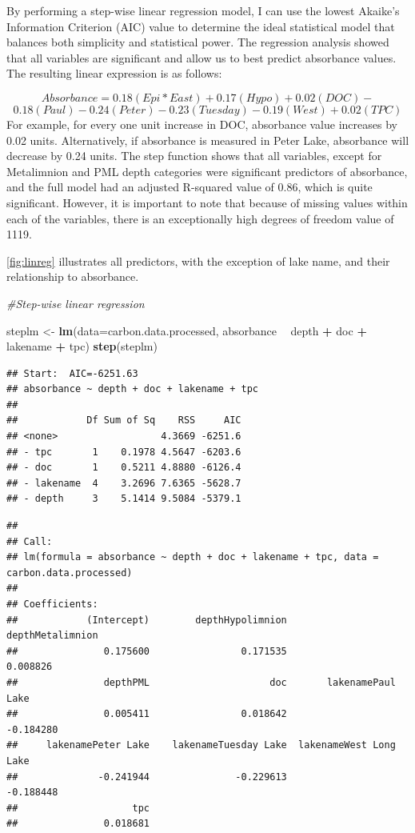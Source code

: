 \documentclass[12pt,]{article}
\newenvironment{Shaded}{\begin{snugshade}}{\end{snugshade}}
\newcommand{\KeywordTok}[1]{\textcolor[rgb]{0.13,0.29,0.53}{\textbf{#1}}}
\newcommand{\DataTypeTok}[1]{\textcolor[rgb]{0.13,0.29,0.53}{#1}}
\newcommand{\StringTok}[1]{\textcolor[rgb]{0.31,0.60,0.02}{#1}}
\newcommand{\CommentTok}[1]{\textcolor[rgb]{0.56,0.35,0.01}{\textit{#1}}}
\newcommand{\OperatorTok}[1]{\textcolor[rgb]{0.81,0.36,0.00}{\textbf{#1}}}
\newcommand{\NormalTok}[1]{#1}
\begin{document}
By performing a step-wise linear regression model, I can use the lowest
Akaike's Information Criterion (AIC) value to determine the ideal
statistical model that balances both simplicity and statistical power.
The regression analysis showed that all variables are significant and
allow us to best predict absorbance values. The resulting linear
expression is as follows:

\[Absorbance = 0.18(Epi*East) + 0.17(Hypo) + 0.02(DOC) -\]
\[0.18(Paul)  - 0.24(Peter) - 0.23(Tuesday) - 0.19(West) + 0.02(TPC) \]
For example, for every one unit increase in DOC, absorbance value
increases by 0.02 units. Alternatively, if absorbance is measured in
Peter Lake, absorbance will decrease by 0.24 units. The step function
shows that all variables, except for Metalimnion and PML depth
categories were significant predictors of absorbance, and the full model
had an adjusted R-squared value of 0.86, which is quite significant.
However, it is important to note that because of missing values within
each of the variables, there is an exceptionally high degrees of freedom
value of 1119.

\autoref{fig:linreg} illustrates all predictors, with the exception of
lake name, and their relationship to absorbance.

\begin{Shaded}
\begin{Highlighting}[]
\CommentTok{#Step-wise linear regression}

\NormalTok{steplm <-}\StringTok{ }\KeywordTok{lm}\NormalTok{(}\DataTypeTok{data=}\NormalTok{carbon.data.processed, absorbance }\OperatorTok{~}\StringTok{ }\NormalTok{depth }\OperatorTok{+}\StringTok{ }\NormalTok{doc  }\OperatorTok{+}\StringTok{ }\NormalTok{lakename }\OperatorTok{+}\StringTok{ }\NormalTok{tpc)}
\KeywordTok{step}\NormalTok{(steplm) }
\end{Highlighting}
\end{Shaded}

\begin{verbatim}
## Start:  AIC=-6251.63
## absorbance ~ depth + doc + lakename + tpc
## 
##            Df Sum of Sq    RSS     AIC
## <none>                  4.3669 -6251.6
## - tpc       1    0.1978 4.5647 -6203.6
## - doc       1    0.5211 4.8880 -6126.4
## - lakename  4    3.2696 7.6365 -5628.7
## - depth     3    5.1414 9.5084 -5379.1
\end{verbatim}

\begin{verbatim}
## 
## Call:
## lm(formula = absorbance ~ depth + doc + lakename + tpc, data = carbon.data.processed)
## 
## Coefficients:
##            (Intercept)        depthHypolimnion        depthMetalimnion  
##               0.175600                0.171535                0.008826  
##               depthPML                     doc       lakenamePaul Lake  
##               0.005411                0.018642               -0.184280  
##     lakenamePeter Lake    lakenameTuesday Lake  lakenameWest Long Lake  
##              -0.241944               -0.229613               -0.188448  
##                    tpc  
##               0.018681
\end{verbatim}
\end{document}
